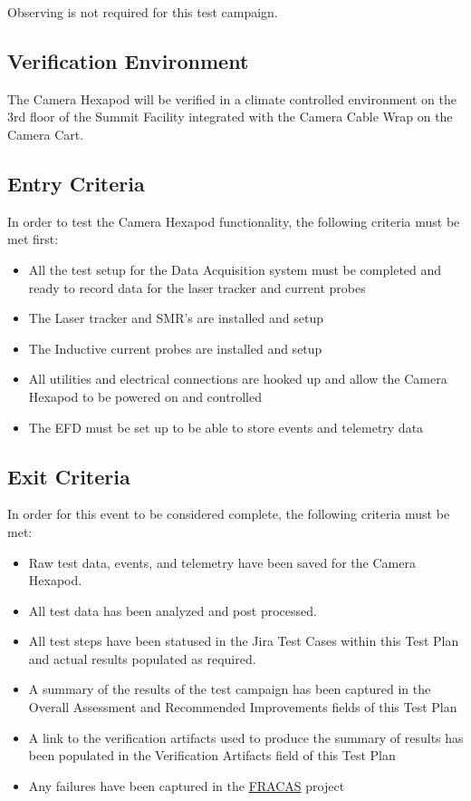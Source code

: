 \documentclass[SE,lsstdraft,STR,toc]{lsstdoc}
\providecommand{\tightlist}{
  \setlength{\itemsep}{0pt}\setlength{\parskip}{0pt}}
\begin{document}
  Observing is not required for this test campaign.

\subsection{Verification Environment}
\label{sect:hwconf}
  The Camera Hexapod will be verified in a climate controlled environment
on the 3rd floor of the Summit Facility integrated with the Camera Cable
Wrap on the Camera Cart.


  \subsection{Entry Criteria}
  In order to test the Camera Hexapod functionality, the following
criteria must be met first:

\begin{itemize}
\tightlist
\item
  All the test setup for the Data Acquisition system must be completed
  and ready to record data for the laser tracker and current probes
\item
  The Laser tracker and SMR's are installed and setup
\item
  The Inductive current probes are installed and setup
\item
  All utilities and electrical connections are hooked up and allow the
  Camera Hexapod to be powered on and controlled
\item
  The EFD must be set up to be able to store events and telemetry data
\end{itemize}


  \subsection{Exit Criteria}
  In order for this event to be considered complete, the following
criteria must be met:

\begin{itemize}
\tightlist
\item
  Raw test data, events, and telemetry have been saved for the Camera
  Hexapod.
\item
  All test data has been analyzed and post processed.
\item
  All test steps have been statused in the Jira Test Cases within this
  Test Plan and actual results populated as required.
\item
  A summary of the results of the test campaign has been captured in the
  Overall Assessment and Recommended Improvements fields of this Test
  Plan
\item
  A link to the verification artifacts used to produce the summary of
  results has been populated in the Verification Artifacts field of this
  Test Plan
\item
  Any failures have been captured in the
  \href{https://jira.lsstcorp.org/projects/FRACAS/issues/}{FRACAS}
  project
\end{itemize}
\end{document}
